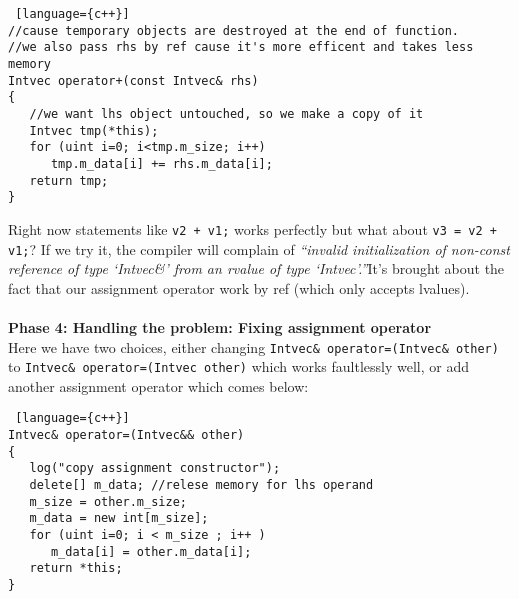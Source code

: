 \begin{note}
\begin{lstlisting} [language={c++}]
//cause temporary objects are destroyed at the end of function.
//we also pass rhs by ref cause it's more efficent and takes less memory
Intvec operator+(const Intvec& rhs)
{
   //we want lhs object untouched, so we make a copy of it
   Intvec tmp(*this);
   for (uint i=0; i<tmp.m_size; i++)
      tmp.m_data[i] += rhs.m_data[i];
   return tmp;
}
\end{lstlisting}
Right now statements like \verb|v2 + v1;| works perfectly but what about \verb|v3 = v2 + v1;|? If we try it, the compiler will complain of \textit{``invalid initialization of non-const reference of type `Intvec\&' from an rvalue of type `Intvec'.''}It's brought about the fact that our assignment operator work by ref (which only accepts lvalues).\\ \\
\textbf{Phase 4: Handling the problem: Fixing assignment operator}\\
Here we have two choices, either changing \verb|Intvec& operator=(Intvec& other)| to \verb|Intvec& operator=(Intvec other)| which works faultlessly well, or add another assignment operator which comes below:
\begin{lstlisting} [language={c++}]
Intvec& operator=(Intvec&& other)
{
   log("copy assignment constructor");
   delete[] m_data; //relese memory for lhs operand
   m_size = other.m_size;
   m_data = new int[m_size];
   for (uint i=0; i < m_size ; i++ )
      m_data[i] = other.m_data[i];
   return *this;
}
\end{lstlisting}

\end{note}

